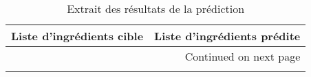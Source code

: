 \begin{longtable}{p{7cm}p{7cm}}
\caption{Extrait des résultats de la prédiction}\label{tbl:GT_prediction_sample}\\ \hline
\toprule
                                                                                                                                                                                                                                                                              Liste d'ingrédients cible &                                                                                                                                                                                                                                                                                                                                                                                                                                             Liste d'ingrédients prédite \\ \hline
\midrule
\endhead
\midrule
\multicolumn{2}{r}{{Continued on next page}} \\ \hline
\midrule
\endfoot


\end{longtable}
